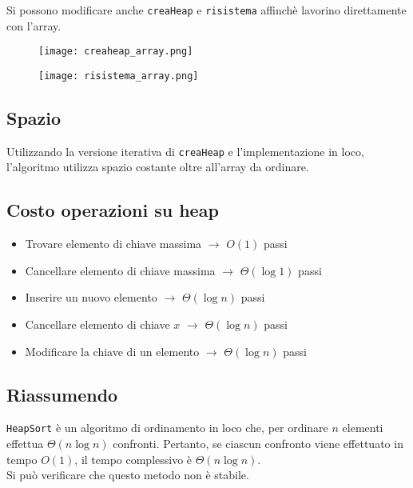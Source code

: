 Si possono modificare anche \texttt{creaHeap} e \texttt{risistema} affinchè lavorino
direttamente con l'array.

\begin{figure}[h]
    \texttt{[image: creaheap\_array.png]}
\end{figure}

\begin{figure}[h]
    \texttt{[image: risistema\_array.png]}
\end{figure}
\clearpage

\subsection{Spazio}
Utilizzando la versione iterativa di \texttt{creaHeap} e l'implementazione in loco,
l'algoritmo utilizza spazio costante oltre all'array da ordinare.

\subsection{Costo operazioni su heap}
\begin{itemize}
    \item Trovare elemento di chiave massima $\rightarrow$ $O(1)$ passi
    \item Cancellare elemento di chiave massima $\rightarrow$ $\Theta(\log 1)$ passi
    \item Inserire un nuovo elemento $\rightarrow$ $\Theta(\log n)$ passi
    \item Cancellare elemento di chiave $x$ $\rightarrow$ $\Theta(\log n)$ passi
    \item Modificare la chiave di un elemento $\rightarrow$ $\Theta(\log n)$ passi
\end{itemize}

\subsection{Riassumendo}
\texttt{HeapSort} è un algoritmo di ordinamento in loco che, per ordinare $n$ elementi 
effettua $\Theta(n \log n)$ confronti. Pertanto, se ciascun confronto viene effettuato
in tempo $O(1)$, il tempo complessivo è $\Theta(n \log n)$.\\
Si può verificare che questo metodo non è stabile.
\clearpage